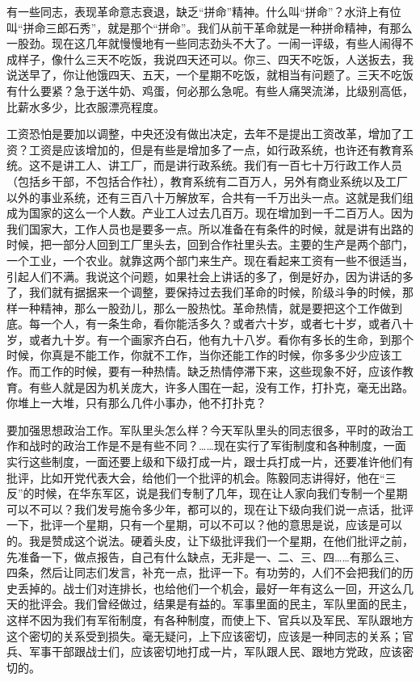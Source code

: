 有一些同志，表现革命意志衰退，缺乏“拼命”精神。什么叫“拼命”？水浒上有位叫“拼命三郎石秀”，就是那个“拼命”。我们从前干革命就是一种拼命精神，有那么一股劲。现在这几年就慢慢地有一些同志劲头不大了。一闹一评级，有些人闹得不成样子，像什么三天不吃饭，我说四天还可以。你三、四天不吃饭，人送扳去，我说送早了，你让他饿四天、五天，一个星期不吃饭，就相当有问题了。三天不吃饭有什么要紧？急于送牛奶、鸡蛋，何必那么急呢。有些人痛哭流涕，比级别高低，比薪水多少，比衣服漂亮程度。

工资恐怕是要加以调整，中央还没有做出决定，去年不是提出工资改革，增加了工资？工资是应该增加的，但是有些是增加多了一点，如行政系统，也许还有教育系统。这不是讲工人、讲工厂，而是讲行政系统。我们有一百七十万行政工作人员（包括乡干部，不包括合作社），教育系统有二百万人，另外有商业系统以及工厂以外的事业系统，还有三百八十万解放军，合共有一千万出头一点。这就是我们组成为国家的这么一个人数。产业工人过去几百万。现在增加到一千二百万人。因为我们国家大，工作人员也是要多一点。所以准备在有条件的时候，就是讲有出路的时候，把一部分人回到工厂里头去，回到合作社里头去。主要的生产是两个部门，一个工业，一个农业。就靠这两个部门来生产。现在看起来工资有一些不很适当，引起人们不满。我说这个问题，如果社会上讲话的多了，倒是好办，因为讲话的多了，我们就有据据来一个调整，要保持过去我们革命的时候，阶级斗争的时候，那样一种精神，那么一股劲儿，那么一股热忱。革命热情，就是要把这个工作做到底。每一个人，有一条生命，看你能活多久？或者六十岁，或者七十岁，或者八十岁，或者九十岁。有一个画家齐白石，他有九十八岁。看你有多长的生命，到那个时候，你真是不能工作，你就不工作，当你还能工作的时候，你多多少少应该工作。而工作的时候，要有一种热情。缺乏热情停滞下来，这些现象不好，应该作教育。有些人就是因为机关庞大，许多人围在一起，没有工作，打扑克，毫无出路。你堆上一大堆，只有那么几件小事办，他不打扑克？

要加强思想政治工作。军队里头怎么样？今天军队里头的同志很多，平时的政治工作和战时的政治工作是不是有些不同？……现在实行了军街制度和各种制度，一面实行这些制度，一面还要上级和下级打成一片，跟士兵打成一片，还要准许他们有批评，比如开党代表大会，给他们一个批评的机会。陈毅同志讲得好，他在“三反”的时候，在华东军区，说是我们专制了几年，现在让人家向我们专制一个星期可以不可以？我们发号施令多少年，都可以的，现在让下级向我们说一点话，批评一下，批评一个星期，只有一个星期，可以不可以？他的意思是说，应该是可以的。我是赞成这个说法。硬着头皮，让下级批评我们一个星期，在他们批评之前，先准备一下，做点报告，自己有什么缺点，无非是一、二、三、四……有那么三、四条，然后让同志们发言，补充一点，批评一下。有功劳的，人们不会把我们的历史丢掉的。战士们对连排长，也给他们一个机会，最好一年有这么一回，开这么几天的批评会。我们曾经做过，结果是有益的。军事里面的民主，军队里面的民主，这样不因为我们有军衔制度，有各种制度，而使上下、官兵以及军民、军队跟地方这个密切的关系受到损失。毫无疑问，上下应该密切，应该是一种同志的关系；官兵、军事干部跟战士们，应该密切地打成一片，军队跟人民、跟地方党政，应该密切的。

